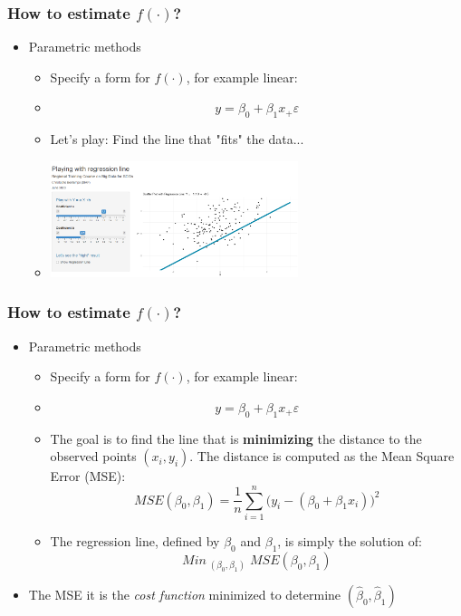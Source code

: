 \documentclass[xcolor=x11names,compress, aspectratio=169]{beamer}
\renewcommand{\(}{\begin{columns}}
\renewcommand{\)}{\end{columns}}
\newcommand{\<}[1]{\begin{column}{#1}}
\renewcommand{\>}{\end{column}}
\begin{document}
\begin{frame} %
\frametitle{How to estimate $f(\cdot)$?}
 \begin{itemize}
  \item<+-> Parametric methods
   \begin{itemize}[<+->]
      \item[] Specify a form for $f(\cdot)$, for example linear:
      \item[] $$y = \beta_0 + \beta_1 x_ + \varepsilon$$
      \item Let's play: Find the line that "fits" the data...
      \item[]  \href{https://xtophedataviz.shinyapps.io/RegressionApp/}{\includegraphics[width = 0.6\textwidth]{RegressionLineGame.PNG}}
 \end{itemize}
 \end{itemize}
\end{frame}



\begin{frame} %
\frametitle{How to estimate $f(\cdot)$?}
 \begin{itemize}
  \item<+-> Parametric methods
   \begin{itemize}
      \item<+->[] Specify a form for $f(\cdot)$, for example linear:
      \item<+->[] $$y = \beta_0 + \beta_1 x_ + \varepsilon$$
      \item<+-> The goal is to find the line that is  \textbf{minimizing} the distance to the observed points $(x_i, y_i)$.
                The distance is computed as the Mean Square Error (MSE): $$ MSE(\beta_0, \beta_1) = \frac{1}{n} \sum_{i=1}^{n} \bigl(y_i - (\beta_0 + \beta_1 x_i)\bigr)^2 $$
      \item<+-> The regression line, defined by $\beta_0$ and $\beta_1$,  is simply the solution of:
       $$Min_{\; (\beta_0 , \beta_1)} \; MSE(\beta_0, \beta_1) $$
   \end{itemize}
 \item<+->[]  The MSE it is the \textit{cost function} minimized to determine $ (\widehat \beta_0, \widehat \beta_1)$
 \end{itemize}

\end{frame}
\end{document}
